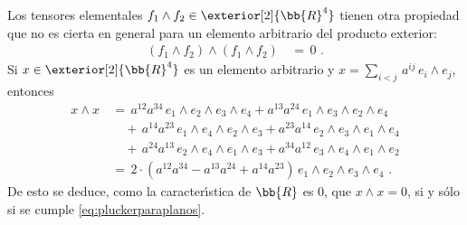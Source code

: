Los tensores elementales $f_{1}\wedge f_{2}\in\exterior[2]{\bb{R}^{4}}$
tienen otra propiedad que no es cierta en general para un elemento
arbitrario del producto exterior:
\begin{align*}
	(f_{1}\wedge f_{2})\wedge (f_{1}\wedge f_{2}) & \,=\,0
	\text{ .}
\end{align*}
%
Si $x\in\exterior[2]{\bb{R}^{4}}$ es un elemento arbitrario y
$x=\sum_{i<j}\,a^{ij}\,e_{i}\wedge e_{j}$, entonces
\begin{align*}
	x\wedge x & \,=\,
		a^{12}a^{34}\,e_{1}\wedge e_{2}\wedge e_{3}\wedge e_{4} +
		a^{13}a^{24}\,e_{1}\wedge e_{3}\wedge e_{2}\wedge e_{4} \\
	& \quad\,+\,
		a^{14}a^{23}\,e_{1}\wedge e_{4}\wedge e_{2}\wedge e_{3} +
		a^{23}a^{14}\,e_{2}\wedge e_{3}\wedge e_{1}\wedge e_{4} \\
	& \quad\,+\,
		a^{24}a^{13}\,e_{2}\wedge e_{4}\wedge e_{1}\wedge e_{3} +
		a^{34}a^{12}\,e_{3}\wedge e_{4}\wedge e_{1}\wedge e_{2} \\
	& \,=\,2\cdot(a^{12}a^{34}-a^{13}a^{24}+a^{14}a^{23})\,
		e_{1}\wedge e_{2}\wedge e_{3}\wedge e_{4}
	\text{ .}
\end{align*}
%
De esto se deduce, como la caracter\'{\i}stica de $\bb{R}$ es $0$, que
$x\wedge x=0$, si y s\'{o}lo si se cumple \eqref{eq:pluckerparaplanos}.

